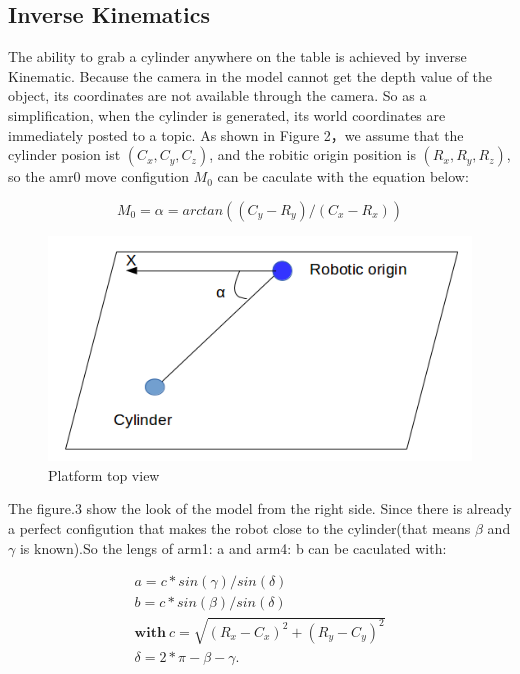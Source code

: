 \subsection{Inverse Kinematics}

The ability to grab a cylinder anywhere on the table is achieved by inverse Kinematic. Because the camera in the model cannot get the depth value of the object, its coordinates are not available through the camera. So as a simplification, when the cylinder is generated, its world coordinates are immediately posted to a topic. As shown in Figure 2，we assume that the cylinder posion ist $(C_x, C_y, C_z)$, and the robitic origin position is  $(R_x, R_y, R_z)$, so the amr0 move configution $M_0$ can be caculate with the equation below:


\begin{equation}
\label{simple_equation}
M_0=\alpha = arctan((C_y-R_y)/(C_x-R_x))
\end{equation}









\begin{figure}[htpb]
\centering
	\includegraphics[width=0.96\linewidth]{figures/3.png} 
	\caption{Platform top view}\label{fig:scene}
	\vspace{-0.4cm}
\end{figure}


The figure.3 show the look of the model from the right side. Since there is already a perfect configution that makes the robot close to the cylinder(that means $\beta$ and $\gamma$ is known).So the lengs of arm1: a and arm4: b can be caculated with:

\begin{equation}
\begin{aligned}
a=c*sin(\gamma)/sin(\delta)\\b=c*sin(\beta)/sin(\delta)\\ 
\textbf{with}\ c=\sqrt{(R_x-C_x)^2+(R_y-C_y)^2}\\\delta=2*\pi-\beta-\gamma.
\end{aligned}
\end{equation}



